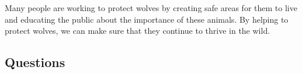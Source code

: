 \documentclass[12pt]{article}
\begin{document}
\begin{tcolorbox}[colframe=black!40, colback=gray!5]
\begin{spacing}{1.15}
    Many people are working to protect wolves by creating safe areas for them to live and educating the public about the importance of these animals. By helping to protect wolves, we can make sure that they continue to thrive in the wild.

\end{spacing}

\end{tcolorbox}

\vspace{1.5cm}

\vspace{0.1cm}

\subsection*{Questions}
\end{document}
